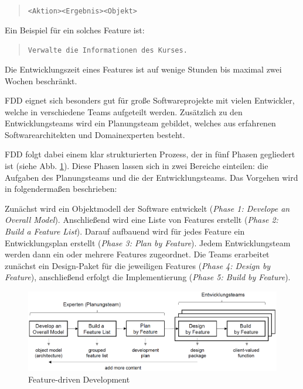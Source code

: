 \documentclass[acmtog]{acmart}
\begin{document}
\begin{quote}
	\texttt{<Aktion>\hspace{5ex}<Ergebnis>\hspace{5ex}<Objekt>}
\end{quote}

Ein Beispiel für ein solches Feature ist:

\begin{quote}
	\texttt{Verwalte die Informationen des Kurses.}
\end{quote}

Die Entwicklungszeit eines Features ist auf wenige Stunden bis maximal zwei Wochen beschränkt.

FDD eignet sich besonders gut für große Softwareprojekte mit vielen Entwickler, welche in verschiedene Teams aufgeteilt werden.
Zusätzlich zu den Entwicklungsteams wird ein Planungsteam gebildet, welches aus erfahrenen Softwarearchitekten und Domainexperten besteht.

FDD folgt dabei einem klar strukturierten Prozess, der in fünf Phasen gegliedert ist (siehe Abb. \ref{fig:fdd}). Diese Phasen lassen sich in zwei Bereiche einteilen: die Aufgaben des Planungsteams und die der Entwicklungsteams. Das Vorgehen wird in \cite{coad99} folgendermaßen beschrieben:

Zunächst wird ein Objektmodell der Software entwickelt (\emph{Phase 1: Develope an Overall Model}).
Anschließend wird eine Liste von Features erstellt (\emph{Phase 2: Build a Feature List}).
Darauf aufbauend wird für jedes Feature ein Entwicklungsplan erstellt (\emph{Phase 3: Plan by Feature}).
Jedem Entwicklungsteam werden dann ein oder mehrere Features zugeordnet.
Die Teams erarbeitet zunächst ein Design-Paket für die jeweiligen Features (\emph{Phase 4: Design by Feature}),
anschließend erfolgt die Implementierung (\emph{Phase 5: Build by Feature}).

\begin{figure}[t]
  \centering
  \includegraphics[width=\linewidth]{images/fdd.png}
  \caption{Feature-driven Development}
    \label{fig:fdd}
  \Description{}
\end{figure}
\end{document}
